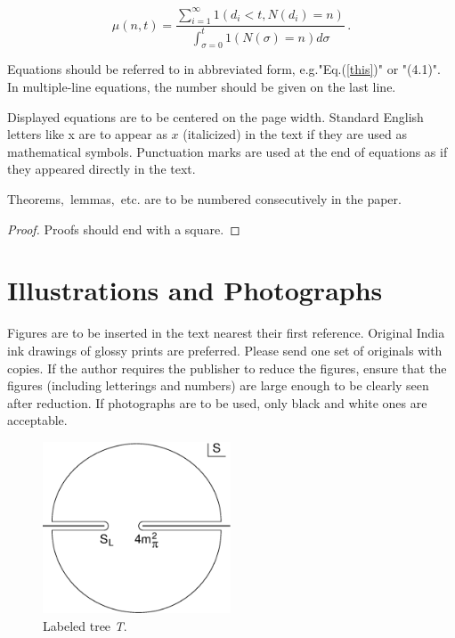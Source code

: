 \documentclass{ws-ijm}
\begin{document}
\noindent
\begin{equation}
\mu(n, t) = \frac{\sum^\infty_{i=1} 1(d_i < t,
N(d_i) = n)}{\int^t_{\sigma=0} 1(N(\sigma) = n)d\sigma}\,.
\label{this}
\end{equation}

Equations should be referred to in abbreviated form,
e.g."Eq.(\ref{this})" or "(4.1)". In multiple-line
equations, the number should be given on the last line.

Displayed equations are to be centered on the page width.
Standard English letters like x are to appear as $x$
(italicized) in the text if they are used as mathematical
symbols. Punctuation marks are used at the end of equations as
if they appeared directly in the text.

\begin{theorem}
Theorems$,$ lemmas$,$ etc. are to be numbered consecutively in the paper.
\end{theorem}

\begin{proof}
Proofs should end with a square.
\end{proof}

\section{Illustrations and Photographs}
Figures are to be inserted in the text nearest their first
reference. Original India ink drawings of glossy prints are
preferred. Please send one set of originals with copies. If the
author requires the publisher to reduce the figures, ensure that
the figures (including letterings and numbers) are large enough
to be clearly seen after reduction. If photographs are to be
used, only black and white ones are\break
acceptable.

\begin{figure}[th]
\centerline{\includegraphics[width=2.2in]{ijmf1}}
\vspace*{8pt}
\caption{Labeled tree {\it T}.\label{fig1}}
\end{figure}
\end{document}
